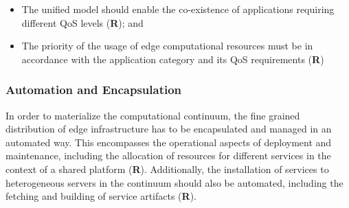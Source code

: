 \begin{itemize}
	\item The unified model should enable the co-existence of applications requiring different QoS levels (\textbf{R}); and
	
	\item The priority of the usage of edge computational resources must be in accordance with the application category and its QoS requirements (\textbf{R})
\end{itemize}


\subsubsection{Automation and Encapsulation}



In order to materialize the computational continuum, the fine grained distribution of edge infrastructure has to be encapsulated and managed in an automated way. This encompasses the operational aspects of deployment and maintenance, including the allocation of resources for different services in the context of a shared platform (\textbf{R}). 
Additionally, the installation of services to heterogeneous servers in the continuum should also be automated, including the fetching and building of service artifacts (\textbf{R}).









